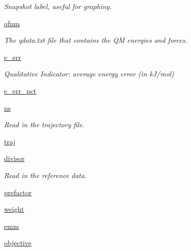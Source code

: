 \begin{DoxyCompactItemize}
\begin{DoxyCompactList}\small\item\em Snapshot label, useful for graphing. \end{DoxyCompactList}\item 
\hyperlink{classforcebalance_1_1interaction_1_1Interaction_a6b49404cbea9c353fc4b97506ff143c6}{qfnm}
\begin{DoxyCompactList}\small\item\em The qdata.\-txt file that contains the Q\-M energies and forces. \end{DoxyCompactList}\item 
\hyperlink{classforcebalance_1_1interaction_1_1Interaction_a1577e34cd7031365ade75a2a56ec9b0d}{e\-\_\-err}
\begin{DoxyCompactList}\small\item\em Qualitative Indicator\-: average energy error (in k\-J/mol) \end{DoxyCompactList}\item 
\hyperlink{classforcebalance_1_1interaction_1_1Interaction_ae66b1b95cac5307950ae787b5409200b}{e\-\_\-err\-\_\-pct}
\item 
\hyperlink{classforcebalance_1_1interaction_1_1Interaction_af8eea2643c465ee51732bff35b4b9bc8}{ns}
\begin{DoxyCompactList}\small\item\em Read in the trajectory file. \end{DoxyCompactList}\item 
\hyperlink{classforcebalance_1_1interaction_1_1Interaction_af838808df9bf58ead305d079ccf21f8a}{traj}
\item 
\hyperlink{classforcebalance_1_1interaction_1_1Interaction_a57f25d35d31643d5467fd32579f64030}{divisor}
\begin{DoxyCompactList}\small\item\em Read in the reference data. \end{DoxyCompactList}\item 
\hyperlink{classforcebalance_1_1interaction_1_1Interaction_ad4e78437713a0b9b809e4ba52cbbf9d2}{prefactor}
\item 
\hyperlink{classforcebalance_1_1interaction_1_1Interaction_a68a6e43e48ec75f375fb987e177126a9}{weight}
\item 
\hyperlink{classforcebalance_1_1interaction_1_1Interaction_a2b97abefbf9d9f2b061b9da3b9d0bb30}{emm}
\item 
\hyperlink{classforcebalance_1_1interaction_1_1Interaction_ad25168cac2752545c55fc7e9206d9d29}{objective}

\end{DoxyCompactItemize}
